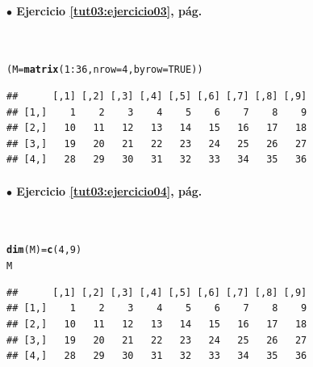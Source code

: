 \documentclass[10pt,a4paper]{article}\usepackage[]{graphicx}\usepackage[]{color}
\makeatletter
\newcommand{\hlnum}[1]{\textcolor[rgb]{0.686,0.059,0.569}{#1}}%
\newcommand{\hlopt}[1]{\textcolor[rgb]{0,0,0}{#1}}%
\newcommand{\hlstd}[1]{\textcolor[rgb]{0.345,0.345,0.345}{#1}}%
\newcommand{\hlkwb}[1]{\textcolor[rgb]{0.69,0.353,0.396}{#1}}%
\newcommand{\hlkwc}[1]{\textcolor[rgb]{0.333,0.667,0.333}{#1}}%
\newcommand{\hlkwd}[1]{\textcolor[rgb]{0.737,0.353,0.396}{\textbf{#1}}}%
\newenvironment{kframe}{%
 \def\at@end@of@kframe{}%
 \ifinner\ifhmode%
  \def\at@end@of@kframe{\end{minipage}}%
  \begin{minipage}{\columnwidth}%
 \fi\fi%
 \def\FrameCommand##1{\hskip\@totalleftmargin \hskip-\fboxsep
 \colorbox{shadecolor}{##1}\hskip-\fboxsep
     \hskip-\linewidth \hskip-\@totalleftmargin \hskip\columnwidth}%
 \MakeFramed {\advance\hsize-\width
   \@totalleftmargin\z@ \linewidth\hsize
   \@setminipage}}%
 {\par\unskip\endMakeFramed%
 \at@end@of@kframe}
\newenvironment{knitrout}{}{} %
\makeatother
\begin{document}
\paragraph{\bf $\bullet$ Ejercicio \ref{tut03:ejercicio03}, pág. \pageref{tut03:ejercicio03}}
\label{tut03:ejercicio03:sol}\quad\\

\begin{knitrout}
\color{fgcolor}\begin{kframe}
\begin{alltt}
\hlstd{(M} \hlkwb{=} \hlkwd{matrix}\hlstd{(}\hlnum{1}\hlopt{:}\hlnum{36}\hlstd{,} \hlkwc{nrow}\hlstd{=}\hlnum{4}\hlstd{,} \hlkwc{byrow}\hlstd{=}\hlnum{TRUE}\hlstd{) )}
\end{alltt}
\begin{verbatim}
##      [,1] [,2] [,3] [,4] [,5] [,6] [,7] [,8] [,9]
## [1,]    1    2    3    4    5    6    7    8    9
## [2,]   10   11   12   13   14   15   16   17   18
## [3,]   19   20   21   22   23   24   25   26   27
## [4,]   28   29   30   31   32   33   34   35   36
\end{verbatim}
\end{kframe}
\end{knitrout}

\paragraph{\bf $\bullet$ Ejercicio \ref{tut03:ejercicio04}, pág. \pageref{tut03:ejercicio04}}
\label{tut03:ejercicio04:sol}\quad\\

\begin{knitrout}
\color{fgcolor}\begin{kframe}
\begin{alltt}
\hlkwd{dim}\hlstd{(M)}\hlkwb{=} \hlkwd{c}\hlstd{(}\hlnum{4}\hlstd{,} \hlnum{9}\hlstd{)}
\hlstd{M}
\end{alltt}
\begin{verbatim}
##      [,1] [,2] [,3] [,4] [,5] [,6] [,7] [,8] [,9]
## [1,]    1    2    3    4    5    6    7    8    9
## [2,]   10   11   12   13   14   15   16   17   18
## [3,]   19   20   21   22   23   24   25   26   27
## [4,]   28   29   30   31   32   33   34   35   36
\end{verbatim}
\end{kframe}
\end{knitrout}
\end{document}
